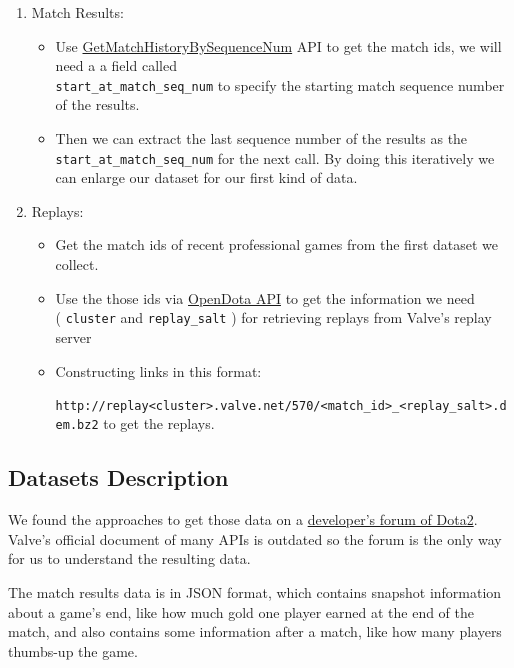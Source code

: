 \documentclass{article}
\newcommand{\codeinline}[1]{
	\texttt{#1}
}
\begin{document}
\begin{enumerate}
\item Match Results:
	\begin{itemize}
		\item Use \href{https://wiki.teamfortress.com/wiki/WebAPI/GetMatchHistoryBySequenceNum}{GetMatchHistoryBySequenceNum} API to get the match ids, we will need a a field called \\ \codeinline{start_at_match_seq_num} to specify the starting match sequence number of the results. 
		\item Then  we can extract the last sequence number of the results as the \codeinline{start_at_match_seq_num} for the next call. By doing this iteratively we can enlarge our dataset for our first kind of data.
	\end{itemize}
\item Replays:
	\begin{itemize}
		\item Get the match ids of recent professional games from the first dataset we collect.
		\item Use the those ids via \href{https://docs.opendota.com/#tag/matches}{OpenDota API} to get the information we need \\ (\codeinline{cluster} and \codeinline{replay_salt}) for retrieving replays from Valve's replay server
		\item Constructing links in this format:\\  \codeinline{ http://replay<cluster>.valve.net/570/<match_id>_<replay_salt>.dem.bz2} to get the replays.
	\end{itemize}
\end{enumerate}



\subsection{Datasets Description}

We found the approaches to get those data on a \href{https://dev.dota2.com}{developer's forum of Dota2}. Valve's official document of many APIs is outdated so the forum is the only way for us to understand the resulting data.

The match results data is in JSON format, which contains snapshot information about a game's end, like how much gold one player earned at the end of the match, and also contains some information after a match, like how many players thumbs-up the game.
\end{document}
